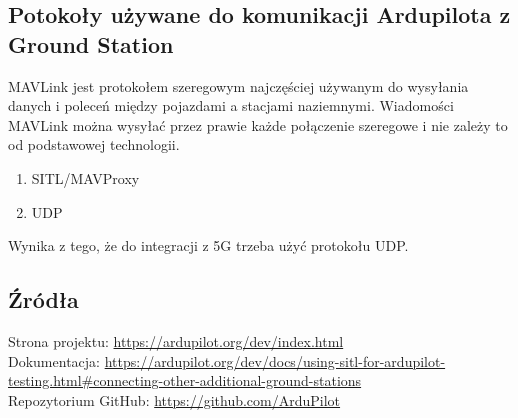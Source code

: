 \documentclass[../Research.tex]{subfiles}
\begin{document}
\pagebreak

\subsection{Potokoły używane do komunikacji Ardupilota z Ground Station}
MAVLink jest protokołem szeregowym najczęściej używanym do wysyłania danych i poleceń między pojazdami a stacjami naziemnymi.
Wiadomości MAVLink można wysyłać przez prawie każde połączenie szeregowe i nie zależy to od podstawowej technologii.

\begin{enumerate}
    \item SITL/MAVProxy
    \item UDP
\end{enumerate}


Wynika z tego, że do integracji z 5G trzeba użyć protokołu UDP.



\subsection{Źródła}
Strona projektu: \url{https://ardupilot.org/dev/index.html}\\
Dokumentacja: \url{https://ardupilot.org/dev/docs/using-sitl-for-ardupilot-testing.html#connecting-other-additional-ground-stations}\\
Repozytorium GitHub: \url{https://github.com/ArduPilot}\\
\end{document}
